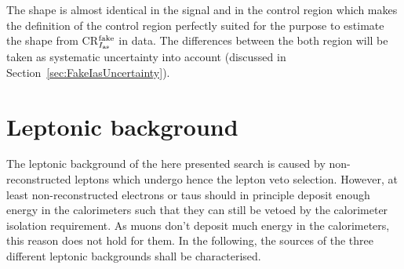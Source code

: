 The \ias shape is almost identical in the signal and in the control region which makes the definition of the control region perfectly suited for the purpose to estimate the \ias shape from CR$_{I_{\text{as}}}^{\text{fake}}$ in data.
The differences between the both region will be taken as systematic uncertainty into account (discussed in Section~\ref{sec:FakeIasUncertainty}).

\section{Leptonic background}
\label{sec:LeptonicBkg}

The leptonic background of the here presented search is caused by non-reconstructed leptons which undergo hence the lepton veto selection.
However, at least non-reconstructed electrons or taus should in principle deposit enough energy in the calorimeters such that they can still be vetoed by the calorimeter isolation requirement.
As muons don't deposit much energy in the calorimeters, this reason does not hold for them.
In the following, the sources of the three different leptonic backgrounds shall be characterised.

